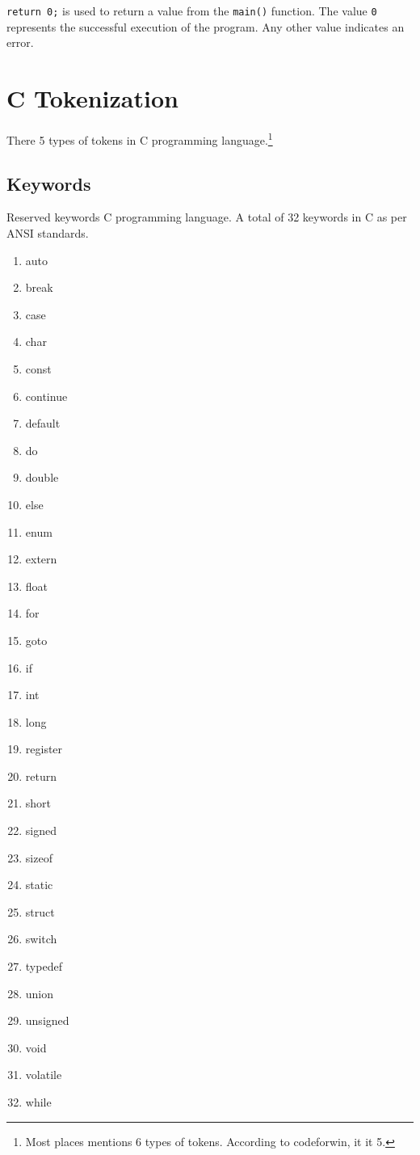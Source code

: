 \documentclass[
]{article}
\begin{document}
\texttt{return\ 0;} is used to return a value from the \texttt{main()}
function. The value \texttt{0} represents the successful execution of
the program. Any other value indicates an error.

\hypertarget{c-tokenization}{%
\section{C Tokenization}\label{c-tokenization}}

There 5 types of tokens in C programming language.\footnote{Most places
  mentions 6 types of tokens. According to codeforwin, it it 5.}

\hypertarget{keywords}{%
\subsection{Keywords}\label{keywords}}

Reserved keywords C programming language. A total of 32 keywords in C as
per ANSI standards.

\begin{multicols}{4}
\begin{enumerate}
\item auto
\item break
\item case
\item char
\item const
\item continue
\item default
\item do
\item double
\item else
\item enum
\item extern
\item float
\item for
\item goto
\item if
\item int
\item long
\item register
\item return
\item short
\item signed
\item sizeof
\item static
\item struct
\item switch
\item typedef
\item union
\item unsigned
\item void
\item volatile
\item while
\end{enumerate}
\end{multicols}
\end{document}
